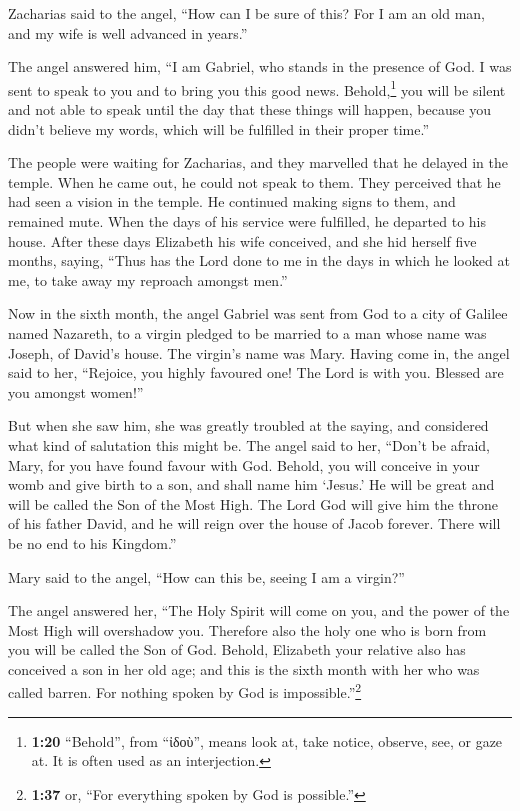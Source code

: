  Zacharias said to the angel, ``How can I be sure of
this? For I am an old man, and my wife is well advanced in years.''

 The angel answered him, ``I am Gabriel, who stands in
the presence of God. I was sent to speak to you and to bring you this
good news.  Behold,\footnote{\textbf{1:20} ``Behold'',
  from ``ἰδοὺ'', means look at, take notice, observe, see, or gaze at.
  It is often used as an interjection.} you will be silent and not able
to speak until the day that these things will happen, because you didn't
believe my words, which will be fulfilled in their proper time.''

 The people were waiting for Zacharias, and they
marvelled that he delayed in the temple.  When he came
out, he could not speak to them. They perceived that he had seen a
vision in the temple. He continued making signs to them, and remained
mute.  When the days of his service were fulfilled, he
departed to his house.  After these days Elizabeth his
wife conceived, and she hid herself five months, saying, 
``Thus has the Lord done to me in the days in which he looked at me, to
take away my reproach amongst men.''

 Now in the sixth month, the angel Gabriel was sent from
God to a city of Galilee named Nazareth,  to a virgin
pledged to be married to a man whose name was Joseph, of David's house.
The virgin's name was Mary.  Having come in, the angel
said to her, ``Rejoice, you highly favoured one! The Lord is with you.
Blessed are you amongst women!''

 But when she saw him, she was greatly troubled at the
saying, and considered what kind of salutation this might be.
 The angel said to her, ``Don't be afraid, Mary, for you
have found favour with God.  Behold, you will conceive in
your womb and give birth to a son, and shall name him `Jesus.'
 He will be great and will be called the Son of the Most
High. The Lord God will give him the throne of his father David,
 and he will reign over the house of Jacob forever. There
will be no end to his Kingdom.''

 Mary said to the angel, ``How can this be, seeing I am a
virgin?''

 The angel answered her, ``The Holy Spirit will come on
you, and the power of the Most High will overshadow you. Therefore also
the holy one who is born from you will be called the Son of God.
 Behold, Elizabeth your relative also has conceived a son
in her old age; and this is the sixth month with her who was called
barren.  For nothing spoken by God is
impossible.''\footnote{\textbf{1:37} or, ``For everything spoken by God
  is possible.''}

